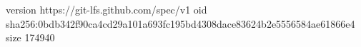 version https://git-lfs.github.com/spec/v1
oid sha256:0bdb342f90ca4cd29a101a693fc195bd4308dace83624b2e5556584ae61866e4
size 174940
